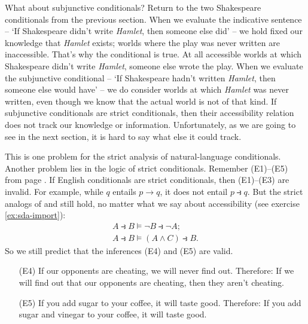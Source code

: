 What about subjunctive conditionals? Return to the two Shakespeare conditionals
from the previous section. When we evaluate the indicative sentence -- `If
Shakespeare didn't write \emph{Hamlet}, then someone else did' -- we hold fixed
our knowledge that \emph{Hamlet} exists; worlds where the play was never written
are inaccessible. That's why the conditional is true. At all accessible worlds
at which Shakespeare didn't write \emph{Hamlet}, someone else wrote the play.
When we evaluate the subjunctive conditional -- `If Shakespeare hadn't written
\emph{Hamlet}, then someone else would have' -- we do consider worlds at which
\emph{Hamlet} was never written, even though we know that the actual world is
not of that kind. If subjunctive conditionals are strict conditionals, then
their accessibility relation does not track our knowledge or information.
Unfortunately, as we are going to see in the next section, it is hard to say
what else it could track.

This is one problem for the strict analysis of natural-language conditionals.
Another problem lies in the logic of strict conditionals. Remember (E1)--(E5)
from page \pageref{paradoxes-mat-imp}. If English conditionals are strict
conditionals, then (E1)--(E3) are invalid. For example, while $q$ entails
$p \to q$, it does not entail $p \strictif q$. But the strict analogs of
 and  still hold, no matter what we say about accessibility (see
exercise \ref{ex:sda-import}):
\begin{gather*}
  A \strictif B \models \neg B\strictif \neg A;\\
  A \strictif B \models (A\land C) \strictif  B.
\end{gather*}
So we still predict that the inferences (E4) and (E5) are valid.

\begin{enumerate}[leftmargin=12mm]
  \itemsep1mm
  \item[(E4)] If our opponents are cheating, we will never find out. Therefore:
        If we will find out that our opponents are cheating, then they aren't
        cheating.
  \item[(E5)] If you add sugar to your coffee, it will taste good. Therefore: If
        you add sugar and vinegar to your coffee, it will taste good.
\end{enumerate}

